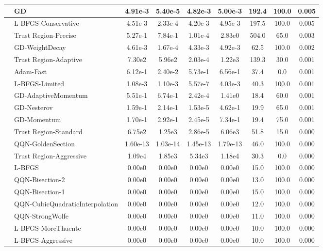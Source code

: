 \documentclass{article}
\begin{document}
\begin{longtable}{|l|l|c|c|c|c|c|c|c|}
\hline
 & GD & 4.91e-3 & 5.40e-5 & 4.82e-3 & 5.00e-3 & 192.4 & 100.0 & 0.005 \\
\hline
 & L-BFGS-Conservative & 4.51e-3 & 2.33e-4 & 4.20e-3 & 4.95e-3 & 197.5 & 100.0 & 0.005 \\
\hline
 & Trust Region-Precise & 5.27e-1 & 7.84e-1 & 1.01e-4 & 2.83e0 & 504.0 & 65.0 & 0.003 \\
\hline
 & GD-WeightDecay & 4.61e-3 & 1.67e-4 & 4.33e-3 & 4.92e-3 & 62.5 & 100.0 & 0.002 \\
\hline
 & Trust Region-Adaptive & 7.30e2 & 5.96e2 & 2.03e-4 & 1.22e3 & 139.3 & 30.0 & 0.001 \\
\hline
 & Adam-Fast & 6.12e-1 & 2.40e-2 & 5.73e-1 & 6.56e-1 & 37.4 & 0.0 & 0.001 \\
\hline
 & L-BFGS-Limited & 1.08e-3 & 1.10e-3 & 5.57e-7 & 4.03e-3 & 40.3 & 100.0 & 0.001 \\
\hline
 & GD-AdaptiveMomentum & 5.51e-1 & 6.74e-1 & 2.42e-4 & 1.41e0 & 18.4 & 60.0 & 0.001 \\
\hline
 & GD-Nesterov & 1.59e-1 & 2.14e-1 & 1.53e-5 & 4.62e-1 & 19.9 & 65.0 & 0.001 \\
\hline
 & GD-Momentum & 1.70e-1 & 2.92e-1 & 2.45e-5 & 7.34e-1 & 19.4 & 75.0 & 0.001 \\
\hline
 & Trust Region-Standard & 6.75e2 & 1.25e3 & 2.86e-5 & 6.06e3 & 51.8 & 15.0 & 0.000 \\
\hline
 & QQN-GoldenSection & 1.60e-13 & 1.03e-14 & 1.45e-13 & 1.79e-13 & 46.0 & 100.0 & 0.000 \\
\hline
 & Trust Region-Aggressive & 1.09e4 & 1.85e3 & 5.34e3 & 1.18e4 & 30.3 & 0.0 & 0.000 \\
\hline
 & L-BFGS & 0.00e0 & 0.00e0 & 0.00e0 & 0.00e0 & 15.0 & 100.0 & 0.000 \\
\hline
 & QQN-Bisection-2 & 0.00e0 & 0.00e0 & 0.00e0 & 0.00e0 & 13.0 & 100.0 & 0.000 \\
\hline
 & QQN-Bisection-1 & 0.00e0 & 0.00e0 & 0.00e0 & 0.00e0 & 15.0 & 100.0 & 0.000 \\
\hline
 & QQN-CubicQuadraticInterpolation & 0.00e0 & 0.00e0 & 0.00e0 & 0.00e0 & 12.0 & 100.0 & 0.000 \\
\hline
 & QQN-StrongWolfe & 0.00e0 & 0.00e0 & 0.00e0 & 0.00e0 & 11.0 & 100.0 & 0.000 \\
\hline
 & L-BFGS-MoreThuente & 0.00e0 & 0.00e0 & 0.00e0 & 0.00e0 & 10.0 & 100.0 & 0.000 \\
\hline
 & L-BFGS-Aggressive & 0.00e0 & 0.00e0 & 0.00e0 & 0.00e0 & 10.0 & 100.0 & 0.000 \\

\end{longtable}
\end{document}
